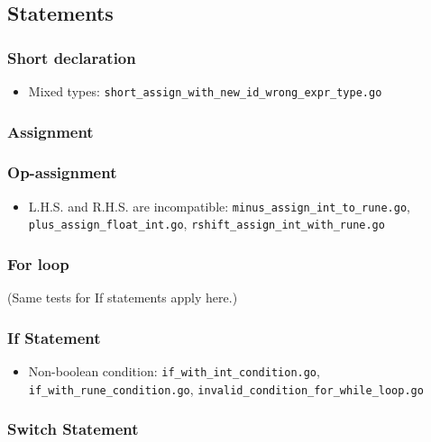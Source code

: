 \documentclass{article}
\begin{document}
\subsection{Statements}

\subsubsection{Short declaration}

\begin{itemize}
\item Mixed types: \texttt{short\_assign\_with\_new\_id\_wrong\_expr\_type.go}
\end{itemize}

\subsubsection{Assignment}
\subsubsection{Op-assignment}

\begin{itemize}
\item L.H.S. and R.H.S. are incompatible: \texttt{minus\_assign\_int\_to\_rune.go}, \texttt{plus\_assign\_float\_int.go}, \texttt{rshift\_assign\_int\_with\_rune.go}
\end{itemize}

\subsubsection{For loop}

(Same tests for If statements apply here.)

\subsubsection{If Statement}

\begin{itemize}
\item Non-boolean condition: \texttt{if\_with\_int\_condition.go}, \texttt{if\_with\_rune\_condition.go}, \texttt{invalid\_condition\_for\_while\_loop.go}
\end{itemize}

\subsubsection{Switch Statement}
\end{document}
